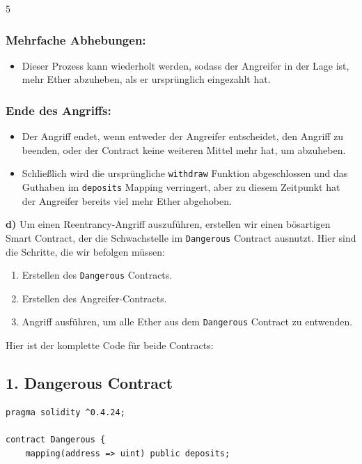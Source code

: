 \documentclass[german]{../uebung}
\begin{document}
\begin{exercise} {5}
    \subsubsection*{Mehrfache Abhebungen:}
    \begin{itemize}
        \item Dieser Prozess kann wiederholt werden, sodass der Angreifer in der Lage ist, mehr Ether abzuheben, als er ursprünglich eingezahlt hat.
    \end{itemize}

    \subsubsection*{Ende des Angriffs:}
    \begin{itemize}
        \item Der Angriff endet, wenn entweder der Angreifer entscheidet, den Angriff zu beenden, oder der Contract keine weiteren Mittel mehr hat, um abzuheben.
        \item Schließlich wird die ursprüngliche \texttt{withdraw} Funktion abgeschlossen und das Guthaben im \texttt{deposits} Mapping verringert, aber zu diesem Zeitpunkt hat der Angreifer bereits viel mehr Ether abgehoben.
    \end{itemize}

    \textbf{d)}
    Um einen Reentrancy-Angriff auszuführen, erstellen wir einen bösartigen Smart Contract, der die Schwachstelle im \texttt{Dangerous} Contract ausnutzt. Hier sind die Schritte, die wir befolgen müssen:

    \begin{enumerate}
        \item Erstellen des \texttt{Dangerous} Contracts.
        \item Erstellen des Angreifer-Contracts.
        \item Angriff ausführen, um alle Ether aus dem \texttt{Dangerous} Contract zu entwenden.
    \end{enumerate}

    Hier ist der komplette Code für beide Contracts:

    \subsection*{1. Dangerous Contract}

    \begin{verbatim}
pragma solidity ^0.4.24;

contract Dangerous {
    mapping(address => uint) public deposits;


\end{verbatim}
\end{exercise}
\end{document}
